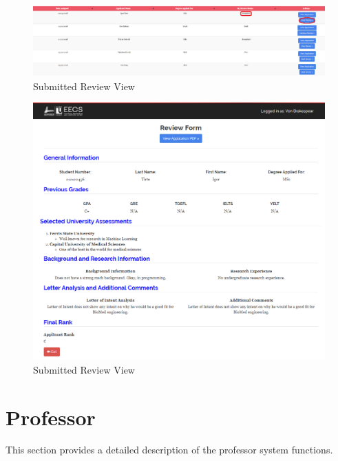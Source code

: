 \documentclass[fontsize=12pt,paper=letter,twoside]{scrartcl}
\begin{document}
\begin{figure}[!htb]
\begin{center}
\includegraphics[width=.8\textwidth]{images/cm/submitted_review.png}
\end{center}
\caption{Submitted Review View}
\label{fig:cm:submitted_review}
\end{figure}

\begin{figure}[!htb]
\begin{center}
\includegraphics[width=.8\textwidth]{images/cm/submit_review_view.png}
\end{center}
\caption{Submitted Review View}
\label{fig:cm:submit_review_view}
\end{figure}

\clearpage
\newpage
\section{Professor}
This section provides a detailed description of the professor system functions.
\end{document}
